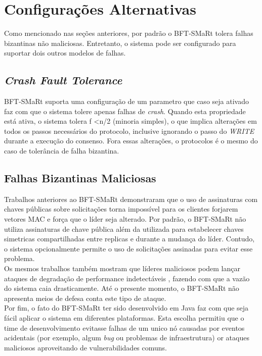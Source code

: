 	 \section{Configurações Alternativas}
	 
	 Como mencionado nas seções anteriores, por padrão o BFT-SMaRt tolera falhas bizantinas não maliciosas. Entretanto, o sistema pode ser configurado para suportar dois outros modelos de falhas.\\
	 
	 	\subsection{\textit{Crash Fault Tolerance}}
	 	BFT-SMaRt suporta uma configuração de um parametro que caso seja ativado faz com que o sistema tolere apenas falhas de \textit{crash}. Quando esta propriedade está ativa, o sistema tolera  f \textless  n/2 (minoria simples), o que implica alterações em todos os passos necessários do protocolo, inclusive ignorando o passo do \textit{WRITE} durante a execução do consenso. Fora essas alterações, o protocolos é o mesmo do caso de tolerância de falha bizantina. 
	 	
	 	\subsection{Falhas Bizantinas Maliciosas}
	 	Trabalhos anteriores ao BFT-SMaRt demonstraram que o uso de assinaturas com chaves públicas sobre solicitações torna impossível para os clientes forjarem vetores MAC e força que o líder seja alterado. Por padrão, o BFT-SMaRt não utiliza assinaturas de chave pública além da utilizada para estabelecer chaves simetricas compartilhadas entre replicas e durante a mudança do líder. Contudo, o sistema opcionalmente permite o uso de solicitações assinadas para evitar esse problema.\\
	 	
	 	Os mesmos trabalhos também mostram que líderes maliciosos podem lançar ataques de degradação de performance indetectáveis , fazendo com que a vazão do sistema caia drasticamente. Até o presente momento, o BFT-SMaRt não apresenta meios de defesa conta este tipo de ataque. \\
	 	
	 	Por fim, o fato do BFT-SMaRt ter sido desenvolvido em Java faz com que seja fácil aplicar o sistema em diferentes plataformas. Esta escolha permitiu que o time de desenvolvimento evitasse falhas de um unico nó causadas por eventos acidentais (por exemplo, algum \textit{bug} ou problemas de infraestrutura) or ataques maliciosos aproveitando de vulnerabilidades comuns.  \\
	   
	
		
	

